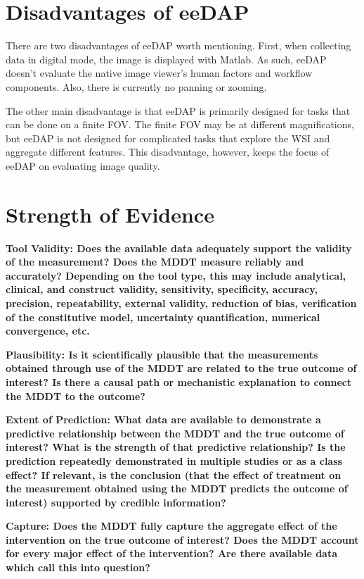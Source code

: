 \documentclass{article}%
\begin{document}
\section{Disadvantages of eeDAP}

\label{disadvantages-of-eedap}

There are two disadvantages of eeDAP worth mentioning. First, when collecting
data in digital mode, the image is displayed with Matlab. As such, eeDAP
doesn't evaluate the native image viewer's human factors and workflow
components. Also, there is currently no panning or zooming.

The other main disadvantage is that eeDAP is primarily designed for tasks that
can be done on a finite FOV. The finite FOV may be at different
magnifications, but eeDAP is not designed for complicated tasks that explore
the WSI and aggregate different features. This disadvantage, however, keeps
the focus of eeDAP on evaluating image quality.

\section{Strength of Evidence}

\label{strength-of-evidence}

\textbf{Tool Validity: Does the available data adequately support the validity
of the measurement? Does the MDDT measure reliably and accurately? Depending
on the tool type, this may include analytical, clinical, and construct
validity, sensitivity, specificity, accuracy, precision, repeatability,
external validity, reduction of bias, verification of the constitutive model,
uncertainty quantification, numerical convergence, etc.}

\textbf{Plausibility: Is it scientifically plausible that the measurements
obtained through use of the MDDT are related to the true outcome of interest?
Is there a causal path or mechanistic explanation to connect the MDDT to the
outcome?}

\textbf{Extent of Prediction: What data are available to demonstrate a
predictive relationship between the MDDT and the true outcome of interest?
What is the strength of that predictive relationship? Is the prediction
repeatedly demonstrated in multiple studies or as a class effect? If relevant,
is the conclusion (that the effect of treatment on the measurement obtained
using the MDDT predicts the outcome of interest) supported by credible
information?}

\textbf{Capture: Does the MDDT fully capture the aggregate effect of the
intervention on the true outcome of interest? Does the MDDT account for every
major effect of the intervention? Are there available data which call this
into question?}
\end{document}
